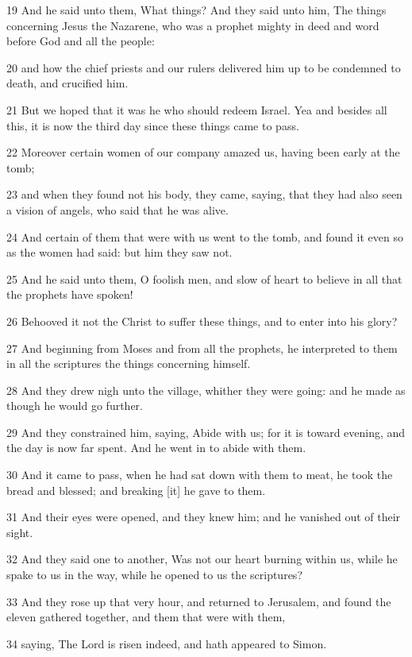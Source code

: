 \par 19 And he said unto them, What things? And they said unto him, The things concerning Jesus the Nazarene, who was a prophet mighty in deed and word before God and all the people:
\par 20 and how the chief priests and our rulers delivered him up to be condemned to death, and crucified him.
\par 21 But we hoped that it was he who should redeem Israel. Yea and besides all this, it is now the third day since these things came to pass.
\par 22 Moreover certain women of our company amazed us, having been early at the tomb;
\par 23 and when they found not his body, they came, saying, that they had also seen a vision of angels, who said that he was alive.
\par 24 And certain of them that were with us went to the tomb, and found it even so as the women had said: but him they saw not.
\par 25 And he said unto them, O foolish men, and slow of heart to believe in all that the prophets have spoken!
\par 26 Behooved it not the Christ to suffer these things, and to enter into his glory?
\par 27 And beginning from Moses and from all the prophets, he interpreted to them in all the scriptures the things concerning himself.
\par 28 And they drew nigh unto the village, whither they were going: and he made as though he would go further.
\par 29 And they constrained him, saying, Abide with us; for it is toward evening, and the day is now far spent. And he went in to abide with them.
\par 30 And it came to pass, when he had sat down with them to meat, he took the bread and blessed; and breaking [it] he gave to them.
\par 31 And their eyes were opened, and they knew him; and he vanished out of their sight.
\par 32 And they said one to another, Was not our heart burning within us, while he spake to us in the way, while he opened to us the scriptures?
\par 33 And they rose up that very hour, and returned to Jerusalem, and found the eleven gathered together, and them that were with them,
\par 34 saying, The Lord is risen indeed, and hath appeared to Simon.
